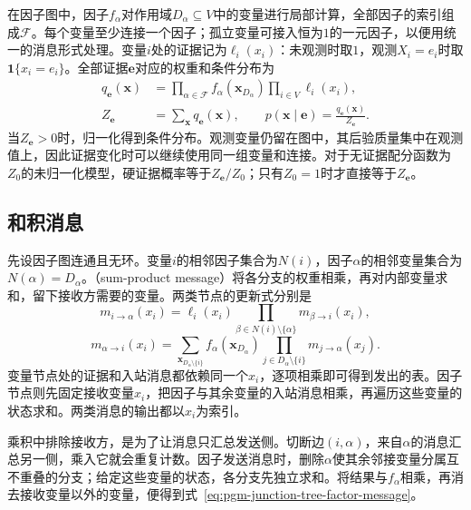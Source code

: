 在因子图中，因子$f_\alpha$对作用域$D_\alpha\subseteq V$中的变量进行局部计算，全部因子的索引组成$\mathcal{F}$。每个变量至少连接一个因子；孤立变量可接入恒为$1$的一元因子，以便用统一的消息形式处理。变量$i$处的证据记为$\ell_i(x_i)$：未观测时取$1$，观测$X_i=e_i$时取$\mathbf{1}\{x_i=e_i\}$。全部证据$\bm e$对应的权重和条件分布为
\begin{equation}
  \begin{aligned}
    q_{\bm{e}}(\bm{x})
      &=\prod_{\alpha\in\mathcal{F}}f_\alpha(\bm{x}_{D_\alpha})
        \prod_{i\in V}\ell_i(x_i),\\
    Z_{\bm{e}}&=\sum_{\bm{x}}q_{\bm{e}}(\bm{x}),\qquad
    p(\bm{x}\mid\bm{e})=\frac{q_{\bm{e}}(\bm{x})}{Z_{\bm{e}}}.
  \end{aligned}
  \label{eq:pgm-junction-tree-evidence-weight}
\end{equation}
当$Z_{\bm e}>0$时，归一化得到条件分布。观测变量仍留在图中，其后验质量集中在观测值上，因此证据变化时可以继续使用同一组变量和连接。对于无证据配分函数为$Z_0$的未归一化模型，硬证据概率等于$Z_{\bm e}/Z_0$；只有$Z_0=1$时才直接等于$Z_{\bm e}$。

\subsection{和积消息}
\label{sec:pgm-junction-tree-sum-product}

先设因子图连通且无环。变量$i$的相邻因子集合为$N(i)$，因子$\alpha$的相邻变量集合为$N(\alpha)=D_\alpha$。（sum-product message）将各分支的权重相乘，再对内部变量求和，留下接收方需要的变量。两类节点的更新式分别是
\begin{equation}
  m_{i\to\alpha}(x_i)
    =\ell_i(x_i)
      \prod_{\beta\in N(i)\setminus\{\alpha\}}
      m_{\beta\to i}(x_i),
  \label{eq:pgm-junction-tree-variable-message}
\end{equation}
\begin{equation}
  m_{\alpha\to i}(x_i)
    =\sum_{\bm{x}_{D_\alpha\setminus\{i\}}}
      f_\alpha(\bm{x}_{D_\alpha})
      \prod_{j\in D_\alpha\setminus\{i\}}
      m_{j\to\alpha}(x_j).
  \label{eq:pgm-junction-tree-factor-message}
\end{equation}
变量节点处的证据和入站消息都依赖同一个$x_i$，逐项相乘即可得到发出的表。因子节点则先固定接收变量$x_i$，把因子与其余变量的入站消息相乘，再遍历这些变量的状态求和。两类消息的输出都以$x_i$为索引。

乘积中排除接收方，是为了让消息只汇总发送侧。切断边$(i,\alpha)$，来自$\alpha$的消息汇总另一侧，乘入它就会重复计数。因子发送消息时，删除$\alpha$使其余邻接变量分属互不重叠的分支；给定这些变量的状态，各分支先独立求和。将结果与$f_\alpha$相乘，再消去接收变量以外的变量，便得到式~\eqref{eq:pgm-junction-tree-factor-message}。

